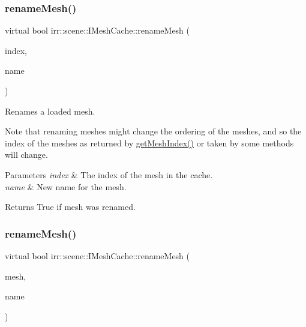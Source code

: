 \subsubsection{\texorpdfstring{rename\+Mesh()}{renameMesh()}\hspace{0.1cm}{\footnotesize\ttfamily [2/4]}}
{\footnotesize\ttfamily virtual bool irr\+::scene\+::\+I\+Mesh\+Cache\+::rename\+Mesh (\begin{DoxyParamCaption}\item[{\hyperlink{namespaceirr_a0416a53257075833e7002efd0a18e804}{u32}}]{index,  }\item[{const \hyperlink{namespaceirr_1_1io_a6468281622ce3a1c46b72e19f32dded5}{io\+::path} \&}]{name }\end{DoxyParamCaption})\hspace{0.3cm}{\ttfamily [pure virtual]}}



Renames a loaded mesh. 

Note that renaming meshes might change the ordering of the meshes, and so the index of the meshes as returned by \hyperlink{classirr_1_1scene_1_1IMeshCache_a2b3512bd3ff11d0b290fa5d2d580eb54}{get\+Mesh\+Index()} or taken by some methods will change. 
\begin{DoxyParams}{Parameters}
{\em index} & The index of the mesh in the cache. \\
\hline
{\em name} & New name for the mesh. \\
\hline
\end{DoxyParams}
\begin{DoxyReturn}{Returns}
True if mesh was renamed. 
\end{DoxyReturn}
\mbox{\label{classirr_1_1scene_1_1IMeshCache_a4533c81f4f3df112fa106d6fb1118f3b}} 
\subsubsection{\texorpdfstring{rename\+Mesh()}{renameMesh()}\hspace{0.1cm}{\footnotesize\ttfamily [3/4]}}
{\footnotesize\ttfamily virtual bool irr\+::scene\+::\+I\+Mesh\+Cache\+::rename\+Mesh (\begin{DoxyParamCaption}\item[{const \hyperlink{classirr_1_1scene_1_1IMesh}{I\+Mesh} $\ast$const}]{mesh,  }\item[{const \hyperlink{namespaceirr_1_1io_a6468281622ce3a1c46b72e19f32dded5}{io\+::path} \&}]{name }\end{DoxyParamCaption})\hspace{0.3cm}{\ttfamily [pure virtual]}}



